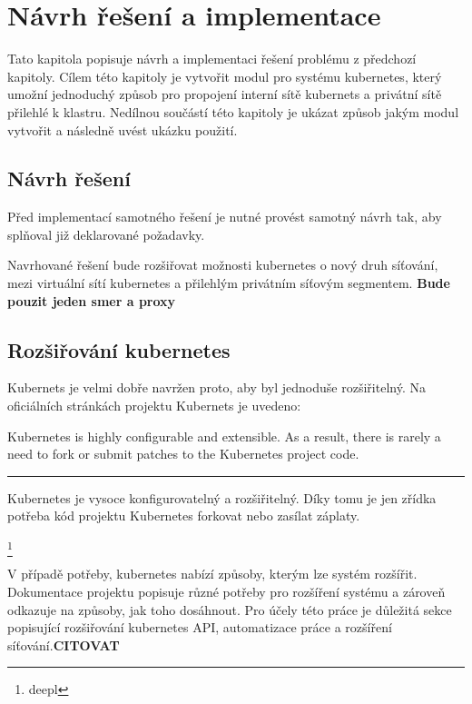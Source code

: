 \chapter{Návrh řešení a implementace}
\noindent\makebox[\linewidth]{\rule{\paperwidth}{0.4pt}}
\begin{chapterabstract}
Tato kapitola popisuje návrh a implementaci řešení problému z předchozí kapitoly. Cílem této kapitoly je vytvořit modul pro systému kubernetes, který umožní jednoduchý způsob pro propojení interní sítě kubernets a privátní sítě přilehlé k klastru. Nedílnou součástí této kapitoly je ukázat způsob jakým modul vytvořit a následně uvést ukázku použití.
\end{chapterabstract}


\section{Návrh řešení}
Před implementací samotného řešení je nutné provést samotný návrh tak, aby splňoval již deklarované požadavky.

Navrhované řešení bude rozšiřovat možnosti kubernetes o nový druh síťování, mezi virtuální sítí kubernetes a přilehlým privátním síťovým segmentem. \textbf{Bude pouzit jeden smer a proxy}  
\section{Rozšiřování kubernetes}
Kubernets je velmi dobře navržen proto, aby byl jednoduše rozšiřitelný. Na oficiálních stránkách projektu Kubernets je uvedeno: 
\begin{displayquote}
Kubernetes is highly configurable and extensible. As a result, there is rarely a need to fork or submit patches to the Kubernetes project code.
\end{displayquote}
\noindent\rule{2cm}{0.4pt}
\begin{displayquote}
Kubernetes je vysoce konfigurovatelný a rozšiřitelný. Díky tomu je jen zřídka potřeba kód projektu Kubernetes forkovat nebo zasílat záplaty.
\end{displayquote}
\cite{thekubernetesauthors_2022_network}\footnote{deepl}

V případě potřeby, kubernetes nabízí způsoby, kterým lze systém rozšířit. Dokumentace projektu popisuje různé potřeby pro rozšíření systému a zároveň odkazuje na způsoby, jak toho dosáhnout. Pro účely této práce je důležitá sekce popisující rozšiřování kubernetes API, automatizace práce a rozšíření síťování.\textbf{CITOVAT}

